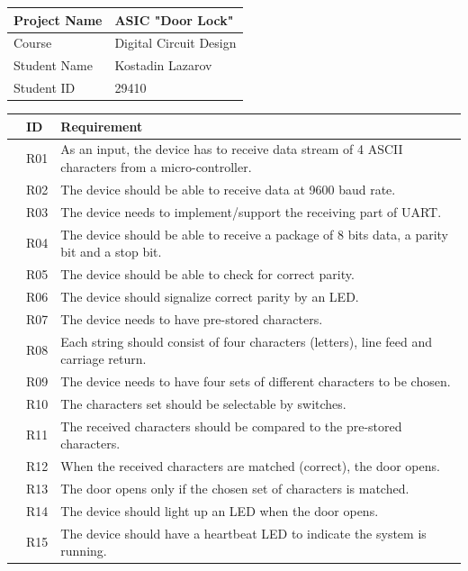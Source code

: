 \documentclass[a4paper, twoside]{report}
\begin{document}
\vspace{15mm} 
\begin{flushleft}
    \begin{tabular}{ | l | l |}
    \hline
    Project Name & ASIC "Door Lock" \\ \hline
    Course & Digital Circuit Design \\ \hline
    Student Name & Kostadin Lazarov \\ \hline
    Student ID & 29410 \\ \hline
    \end{tabular}
\end{flushleft}
\vspace{8mm} %
\begin{flushleft}
    \begin{tabular}{| l | l | p{13cm}|}
    \hline
    	& ID & Requirement \\ \hline
   		& R01 & As an input, the device has to receive data stream of 4 ASCII characters from a micro-controller. \\ \hline
   		& R02 & The device should be able to receive data at 9600 baud rate. \\ \hline
   		& R03 & The device needs to implement/support the receiving part of UART. \\ \hline
   		& R04 & The device should be able to receive a package of 8 bits data, a parity bit and a stop bit. \\ \hline
   		& R05 & The device should be able to check for correct parity. \\ \hline
   		& R06 & The device should signalize correct parity by an LED. \\ \hline
   		& R07 & The device needs to have pre-stored characters. \\ \hline
   		& R08 & Each string should consist of four characters (letters), line feed and carriage return. \\ \hline
   		& R09 & The device needs to have four sets of different characters to be chosen. \\ \hline
   		& R10 & The characters set should be selectable by switches. \\ \hline
   		& R11 & The received characters should be compared to the pre-stored characters. \\ \hline
   		& R12 & When the received characters are matched (correct), the door opens. \\ \hline
   		& R13 & The door opens only if the chosen set of characters is matched. \\ \hline
   		& R14 & The device should light up an LED when the door opens. \\ \hline
   		& R15 & The device should have a heartbeat LED to indicate the system is running. \\ \hline
   		
    \end{tabular}
\end{flushleft}
\end{document}
